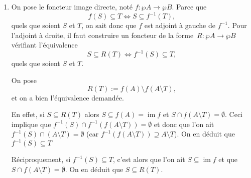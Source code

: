 \documentclass{../../td}
\begin{document}
  \begin{enumerate}
    \item On pose le foncteur image directe, noté $f : \wp A \to \wp B$.
      Parce que \[
      f(S) \subseteq T \iff S \subseteq f^{-1}(T)
      ,\] quels que soient $S$ et $T$, on sait donc que $f$ est adjoint à gauche de $f^{-1}$.
      Pour l'adjoint à droite, il faut construire un foncteur de la forme~$R : \wp A \to \wp B$ vérifiant l'équivalence 
      \[
      S \subseteq R(T) \iff f^{-1}(S) \subseteq T
      ,\] quels que soient $S$ et $T$.

      On pose \[
      R(T) := f(A) \setminus f(A \setminus T) 
      ,\] 
      et on a bien l'équivalence demandée.

      En effet, si $S \subseteq R(T)$ alors $S \subseteq f(A) = \operatorname{im} f$ et $S \cap f(A \setminus T) = \emptyset$.
      Ceci implique que $f^{-1}(S) \cap f^{-1}(f(A \setminus T)) = \emptyset$ et donc que l'on ait $f^{-1}(S) \cap (A \setminus T) = \emptyset$ (car $f^{-1}(f(A \setminus T)) \supseteq A \setminus T$).
      On en déduit que $f^{-1}(S) \subseteq T$

      Réciproquement, si $f^{-1}(S) \subseteq T$, c'est alors que l'on ait $S \subseteq \operatorname{im} f$ et que $S \cap f(A \setminus T) = \emptyset$.
      On en déduit que $S \subseteq R(T)$.


\end{enumerate}
\end{document}
